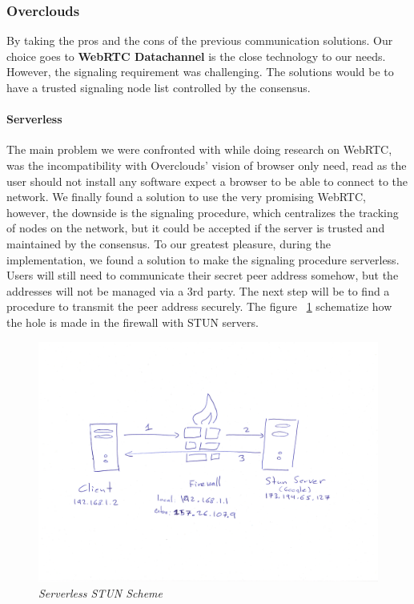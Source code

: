 \subsubsection{Overclouds}
\label{subsec:overclouds}
By taking the pros and the cons of the previous communication solutions. Our choice goes to \textbf{WebRTC Datachannel} is the close technology to our needs. However, the signaling requirement was challenging. The solutions would be to have a trusted signaling node list controlled by the consensus. 

\paragraph{Serverless} The main problem we were confronted with while doing research on WebRTC, was the incompatibility with Overclouds' vision of browser only need, read as the user should not install any software expect a browser to be able to connect to the network. We finally found a solution to use the very promising WebRTC, however, the downside is the signaling procedure, which centralizes the tracking of nodes on the network, but it could be accepted if the server is trusted and maintained by the consensus. To our greatest pleasure, during the implementation, we found a solution to make the signaling procedure serverless. Users will still need to communicate their secret peer address somehow, but the addresses will not be managed via a 3rd party. The next step will be to find a procedure to transmit the peer address securely.
The figure ~\ref{fig:stun-scheme} schematize how the hole is made in the firewall with STUN servers.
\begin{figure}[htpb]
\centering
\caption{\small \sl Serverless STUN Scheme
\label{fig:stun-scheme}}
\begin{adjustbox}{center}
\includegraphics[scale=0.1]{annexes/schemes/stun-scheme.jpg}
\end{adjustbox}
\end{figure} 

